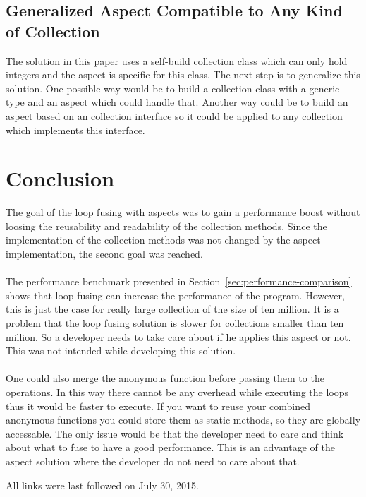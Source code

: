 \documentclass[runningheads,a4paper]{llncs}
\begin{document}
\subsection{Generalized Aspect Compatible to Any Kind of Collection}\label{sub:generalize}
The solution in this paper uses a self-build collection class which can only hold integers and the aspect is specific for this class.
The next step is to generalize this solution. One possible way would be to build a collection class with a generic type and an aspect which could handle that.
Another way could be to build an aspect based on an collection interface so it could be applied to any collection which implements this interface.

\section{Conclusion}\label{sec:conclusion}
The goal of the loop fusing with aspects was to gain a performance boost without loosing the reusability and readability of the collection methods.
Since the implementation of the collection methods was not changed by the aspect implementation, the second goal was reached.\\
\\
The performance benchmark presented in Section~\ref{sec:performance-comparison} shows that loop fusing can increase the performance of the program.
However, this is just the case for really large collection of the size of ten million. It is a problem that the loop fusing solution is slower for collections smaller than ten million.
So a developer needs to take care about if he applies this aspect or not. This was not intended while developing this solution.\\
\\
One could also merge the anonymous function before passing them to the operations. In this way there cannot be any overhead while executing the loops thus it would be faster to execute.
If you want to reuse your combined anonymous functions you could store them as static methods, so they are globally accessable.
The only issue would be that the developer need to care and think about what to fuse to have a good performance. This is an advantage of the aspect solution where the developer do not need to care about that.




All links were last followed on July 30, 2015.
\end{document}
